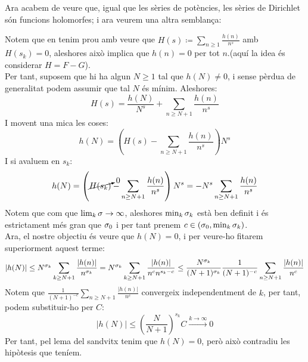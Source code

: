 Ara acabem de veure que, igual que les sèries de potències, les sèries de Dirichlet són funcions holomorfes; i ara veurem una altra semblança:
\begin{pf}
    Notem que en tenim prou amb veure que $H(s)\coloneq\sum_{n\geq1}\frac{h(n)}{n^s}$ amb $H(s_k)=0$, aleshores això implica que $h(n)=0$ per tot $n$.(aquí la idea és considerar $H=F-G$).\\
    Per tant, suposem que hi ha algun $N\geq1$ tal que $h(N)\neq0$, i sense pèrdua de generalitat podem assumir que tal $N$ és mínim. Aleshores:
    \[
    H(s)=\frac{h(N)}{N^s}+\sum_{n\geq N+1}\frac{h(n)}{n^s}
    \]
    I movent una mica les coses:
    \[
    h(N)=\left(H(s)-\sum_{n\geq N+1}\frac{h(n)}{n^s}\right)N^s
    \]
    I si avaluem en $s_k$:
    \[
    h(N)=\left(\cancelto{0}{H(s_k)}-\sum_{n\geq N+1}\frac{h(n)}{n^s}\right)N^s=-N^s\sum_{n\geq N+1}\frac{h(n)}{n^s}
    \]
    Notem que com que $\lim_{k}\sigma\rightarrow\infty$, aleshores $\min_k \sigma_k$ està ben definit i és estrictament més gran que $\sigma_0$ i per tant prenem $c\in(\sigma_0,\min_k\sigma_k)$.\\
    Ara, el nostre objectiu és veure que $h(N)=0$, i per veure-ho fitarem superiorment aquest terme:
    \[
    |h(N)|\leq N^{\sigma_k}\sum_{k\geq N+1}\frac{|h(n)|}{n^{\sigma_k}}=N^{\sigma_k}\sum_{k\geq N+1}\frac{|h(n)|}{n^cn^{s_k-c}}\leq\frac{N^{\sigma_k}}{(N+1)^{\sigma_k}}\frac{1}{(N+1)^{-c}}\sum_{n\geq N+1}\frac{|h(n)|}{n^c}
    \]
    Notem que $\frac{1}{(N+1)^{-c}}\sum_{n\geq N+1}\frac{|h(n)|}{n^c}$ convergeix independentment de $k$, per tant, podem substituir-ho per $C$:
    \[
    |h(N)|\leq \left(\frac{N}{N+1}\right)^{s_k}C\xrightarrow{k\rightarrow\infty}0
    \]
    Per tant, pel lema del sandvitx tenim que $h(N)=0$, però això contradiu les hipòtesis que teníem.
\end{pf}

